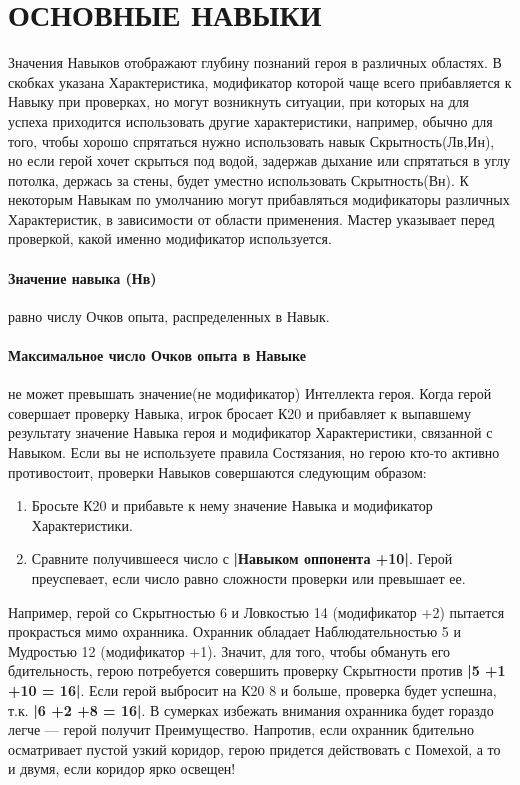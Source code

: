 \section{ОСНОВНЫЕ НАВЫКИ}
Значения Навыков отображают глубину познаний героя в различных областях. В скобках указана Характеристика, модификатор которой чаще всего прибавляется к Навыку при проверках, но могут возникнуть ситуации, при которых на для успеха приходится использовать другие характеристики, например, обычно для того, чтобы хорошо спрятаться нужно использовать навык Скрытность(Лв,Ин), но если герой хочет скрыться под водой, задержав дыхание или спрятаться в углу потолка, держась за стены, будет уместно использовать Скрытность(Вн). К некоторым Навыкам по умолчанию могут прибавляться модификаторы различных Характеристик, в зависимости от области применения. Мастер указывает перед проверкой, какой именно модификатор используется.
\paragraph{Значение навыка (Нв)} равно числу Очков опыта, распределенных в Навык.
\paragraph{Максимальное число Очков опыта в Навыке} не может превышать значение(не модификатор) Интеллекта героя. Когда герой совершает проверку Навыка, игрок бросает К20 и прибавляет к выпавшему результату значение Навыка героя и модификатор Характеристики, связанной с Навыком.
\newline
Если вы не используете правила Состязания, но герою кто-то активно противостоит, проверки Навыков совершаются следующим образом:
\begin{enumerate}
\item Бросьте К20 и прибавьте к нему значение Навыка и модификатор Характеристики.
\item Сравните получившееся число с \textbf{|Навыком оппонента +10|}. Герой преуспевает, если число равно сложности проверки или превышает ее.
\end{enumerate}
Например, герой со Скрытностью 6 и Ловкостью 14 (модификатор +2) пытается прокрасться мимо охранника. Охранник обладает Наблюдательностью 5 и Мудростью 12 (модификатор +1). Значит, для того, чтобы обмануть его бдительность, герою потребуется совершить проверку Скрытности против \textbf{|5 +1 +10 = 16|}. Если герой выбросит на К20 8 и больше, проверка будет успешна, т.к. \textbf{|6 +2 +8 = 16|}. В сумерках избежать внимания охранника будет гораздо легче — герой получит Преимущество. Напротив, если охранник бдительно осматривает пустой узкий коридор, герою придется действовать с Помехой, а то и двумя, если коридор ярко освещен!
